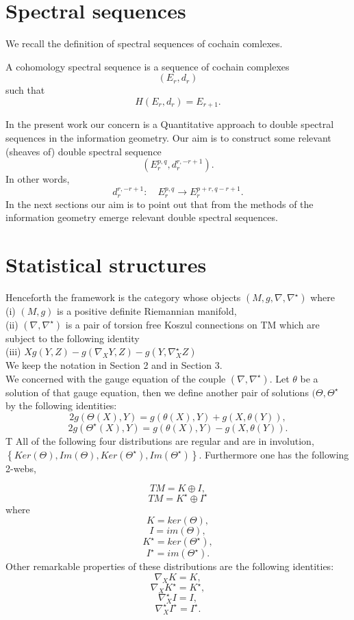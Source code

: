 \section{Spectral sequences}
We recall the definition of spectral sequences of cochain comlexes.
\begin{defn} A cohomology spectral sequence is a sequence of cochain complexes $$(E_r,d_r)$$ 
such that
$$H(E_r,d_r) = E_{r+1}.$$
\end{defn}
In the present work our concern is a Quantitative approach to double spectral sequences in the information geometry. Our aim is to construct some relevant (sheaves of) double spectral sequence  $$( E^{p,q}_r,d^{r,-r+1}_r ).$$
In other words,
$$d^{r,-r+1}_r:\quad E^{p,q}_r \rightarrow E^{p + r,q - r + 1}_r.$$
In the next sections our aim is to point out that from the methods of the information geometry emerge relevant double spectral sequences.
\section{Statistical structures}
Henceforth the framework is the category whose objects $(M,g,\nabla,\nabla^\star)$ where \\
(i) $(M,g)$ is a positive definite Riemannian manifold,\\
(ii) $(\nabla,\nabla^\star)$ is a pair of torsion free Koszul connections on TM which are subject to the following identity\\
(iii) $Xg(Y,Z) - g(\nabla_XY,Z) - g(Y,\nabla^\star_XZ)$\\
We keep the notation in Section 2 and in Section 3.\\
We concerned with the gauge equation of the couple $(\nabla,\nabla^\star)$. Let $\theta$ be a solution of that gauge equation, then we define another pair of solutions $(\Theta,\Theta^\star$ by the following identities:
$$2g(\Theta(X),Y) = g(\theta(X), Y) + g(X, \theta(Y)),$$
$$2g(\Theta^\star(X),Y) = g(\theta(X), Y) - g(X, \theta(Y)).$$
T
All of the following four distributions are regular and are 
in involution,\\
$\left\{Ker(\Theta),Im(\Theta), Ker(\Theta^\star), Im(\Theta^\star)\right\}.$ Furthermore one has the following 2-webs,

$$TM = K \oplus I,$$ 
$$TM = K^\star \oplus I^\star$$ 
where
$$K = ker(\Theta),$$
$$I = im(\Theta),$$
$$K^\star = ker(\Theta^\star),$$
$$I^\star = im(\Theta^\star).$$
Other remarkable properties of these distributions are the following identities:
$$\nabla_XK = K,$$
$$\nabla_XK^\star = K^\star,$$
$$\nabla^\star_XI = I,$$
$$\nabla^\star_XI^\star = I^\star.$$

